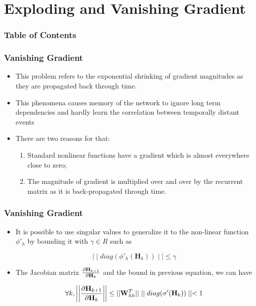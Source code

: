 \documentclass[
	11pt,
]{beamer}
\begin{document}
\section{Exploding and Vanishing Gradient}
\begin{frame}
	\frametitle{Table of Contents}
	\tableofcontents[currentsection]
\end{frame}

\begin{frame}
	\frametitle{Vanishing Gradient}
	\begin{itemize}
		\item This problem refers to the exponential shrinking of gradient
		magnitudes as they are propagated back through time.
		\bigskip
		\item This phenomena causes memory of the network to ignore long
		term dependencies and hardly learn the correlation between
		temporally distant events
		\bigskip
		\item There are two reasons for that:
		\begin{enumerate}
			\item Standard nonlinear functions have a gradient which is almost everywhere close to zero;
			\item The magnitude of gradient is multiplied over and over by the recurrent matrix as it is back-propagated through time.
		\end{enumerate}
	\end{itemize}
\end{frame}

\begin{frame}
	\frametitle{Vanishing Gradient}
	\begin{itemize}
		\item It is possible to use singular values to generalize it to the non-linear function $\phi'_h$ by bounding it with $\gamma \in R$
		such as
		\bigskip
	\begin{block}{}
		\begin{equation*}
			\mid\mid diag(\phi'_h(\mathbf{H}_k)) \mid\mid \le \gamma
		\end{equation*}
	\end{block}
		\bigskip
		\item The Jacobian matrix $\pdv{\mathbf{H}_{k+1}}{\mathbf{H}_k}$ and the bound
		in previous equation, we can have
	\begin{block}{}
		\bigskip
		\begin{equation*}
			\forall k, \bigg |\bigg | \pdv{\mathbf{H}_{k+1}}{\mathbf{H}_k} \bigg |\bigg | \le ||\mathbf{W}_{hh}^T||
			\mid\mid diag(\sigma'(\mathbf{H}_k))\mid\mid <  1
		\end{equation*}
	\end{block}
\end{itemize}
\end{frame}
\end{document}
